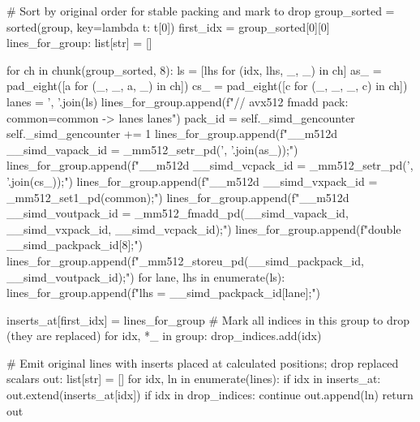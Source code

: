 \begin{python}
            # Sort by original order for stable packing and mark to drop
            group_sorted = sorted(group, key=lambda t: t[0])
            first_idx = group_sorted[0][0]
            lines_for_group: list[str] = []

            for ch in chunk(group_sorted, 8):
                ls = [lhs for (idx, lhs, _, _) in ch]
                as_ = pad_eight([a for (_, _, a, _) in ch])
                cs_ = pad_eight([c for (_, _, _, c) in ch])
                lanes = ', '.join(ls)
                lines_for_group.append(f"// avx512 fmadd pack: common={common} -> lanes {lanes}")
                pack_id = self._simd_gencounter
                self._simd_gencounter += 1
                lines_for_group.append(f"__m512d __simd_va{pack_id} = _mm512_setr_pd({', '.join(as_)});")
                lines_for_group.append(f"__m512d __simd_vc{pack_id} = _mm512_setr_pd({', '.join(cs_)});")
                lines_for_group.append(f"__m512d __simd_vx{pack_id} = _mm512_set1_pd({common});")
                lines_for_group.append(f"__m512d __simd_vout{pack_id} = _mm512_fmadd_pd(__simd_va{pack_id}, __simd_vx{pack_id}, __simd_vc{pack_id});")
                lines_for_group.append(f"double __simd_pack{pack_id}[8];")
                lines_for_group.append(f"_mm512_storeu_pd(__simd_pack{pack_id}, __simd_vout{pack_id});")
                for lane, lhs in enumerate(ls):
                    lines_for_group.append(f"{lhs} = __simd_pack{pack_id}[{lane}];")

            inserts_at[first_idx] = lines_for_group
            # Mark all indices in this group to drop (they are replaced)
            for idx, *_ in group:
                drop_indices.add(idx)

        # Emit original lines with inserts placed at calculated positions; drop replaced scalars
        out: list[str] = []
        for idx, ln in enumerate(lines):
            if idx in inserts_at:
                out.extend(inserts_at[idx])
            if idx in drop_indices:
                continue
            out.append(ln)
        return out
\end{python}\label{eq:simd_power_series}
